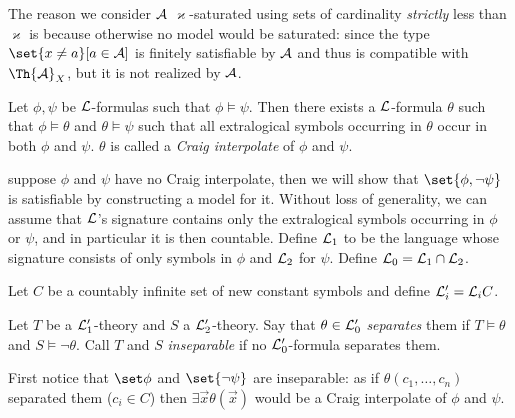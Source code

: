 \edefn

The reason we consider ${\cal A}$ $\varkappa$-saturated using sets of cardinality {\it strictly} less than $\varkappa$ is because otherwise no model would be saturated: since the type
$\set{x\neq a}[a\in{\cal A}]$ is finitely satisfiable by ${\cal A}$ and thus is compatible with $\Th{\cal A}_X$, but it is not realized by ${\cal A}$.

\bthrm[title=Craig's Interpolation Theorem, name=craigthrm]

    Let $\phi,\psi$ be ${\cal L}$-formulas such that $\phi\vDash\psi$.
    Then there exists a ${\cal L}$-formula $\theta$ such that $\phi\vDash\theta$ and $\theta\vDash\psi$ such that all extralogical symbols occurring in $\theta$ occur in both $\phi$ and $\psi$.
    $\theta$ is called a {\it Craig interpolate} of $\phi$ and $\psi$.

\ethrm

\Proof suppose $\phi$ and $\psi$ have no Craig interpolate, then we will show that $\set{\phi,\neg\psi}$ is satisfiable by constructing a model for it.
Without loss of generality, we can assume that ${\cal L}$'s signature contains only the extralogical symbols occurring in $\phi$ or $\psi$, and in particular it is then countable.
Define ${\cal L}_1$ to be the language whose signature consists of only symbols in $\phi$ and ${\cal L}_2$ for $\psi$.
Define ${\cal L}_0={\cal L}_1\cap{\cal L}_2$.

Let $C$ be a countably infinite set of new constant symbols and define ${\cal L}'_i={\cal L}_iC$.

Let $T$ be a ${\cal L}'_1$-theory and $S$ a ${\cal L}'_2$-theory.
Say that $\theta\in{\cal L}'_0$ {\it separates} them if $T\vDash\theta$ and $S\vDash\neg\theta$.
Call $T$ and $S$ {\it inseparable} if no ${\cal L}'_0$-formula separates them.

First notice that $\set\phi$ and $\set{\neg\psi}$ are inseparable: as if $\theta(c_1,\dots,c_n)$ separated them ($c_i\in C$) then $\exists\vec x\theta(\vec x)$ would be a Craig interpolate of $\phi$ and
$\psi$.

